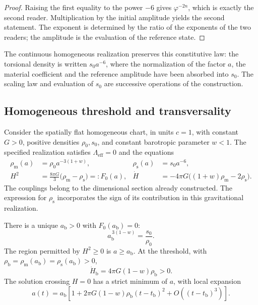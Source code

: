 \begin{proof}
Raising the first equality to the power \(-6\) gives
\(\varphi^{-2n}\), which is exactly the second reader. Multiplication
by the initial amplitude yields the second statement. The exponent
is determined by the ratio of the exponents of the two readers;
the amplitude is the evaluation of the reference state.
\end{proof}

The continuous homogeneous realization preserves this constitutive law:
the torsional density is written \(s_0a^{-6}\), where the normalization
of the factor \(a\), the material coefficient and the reference amplitude
have been absorbed into \(s_0\). The scaling law and evaluation of
\(s_0\) are successive operations of the construction.

\subsection{Homogeneous threshold and transversality}
\label{vii:sec:umbral-rebote}

Consider the spatially flat homogeneous chart, in units \(c=1\),
with constant \(G>0\), positive densities \(\rho_0,s_0\), and constant
barotropic parameter \(w<1\). The specified realization satisfies
\(\Lambda_{\mathrm{eff}}=0\) and the equations
\begin{align}
 \rho_{\mathrm m}(a)&=\rho_0a^{-3(1+w)},&
 \rho_{\mathrm s}(a)&=s_0a^{-6},\\
 H^2&=\frac{8\pi G}{3}
        \bigl(\rho_{\mathrm m}-\rho_{\mathrm s}\bigr)
        =:F_0(a),&
 \dot H&=-4\pi G
        \bigl((1+w)\rho_{\mathrm m}-2\rho_{\mathrm s}\bigr).
 \label{vii:eq:dinamica-homogenea}
\end{align}
The couplings belong to the dimensional section already constructed.
The expression for \(\rho_{\mathrm s}\) incorporates the sign of its
contribution in this gravitational realization.

\begin{theorem}
\label{vii:thm:rebote}
There is a unique \(a_{\mathrm b}>0\) with \(F_0(a_{\mathrm b})=0\):
\[
 a_{\mathrm b}^{\,3(1-w)}=\frac{s_0}{\rho_0}.
\]
The region permitted by \(H^2\geq0\) is \(a\geq a_{\mathrm b}\).
At the threshold, with
\(\rho_{\mathrm b}=\rho_{\mathrm m}(a_{\mathrm b})
                  =\rho_{\mathrm s}(a_{\mathrm b})>0\),
\[
 \dot H_{\mathrm b}=4\pi G(1-w)\rho_{\mathrm b}>0.
\]
The solution crossing \(H=0\) has a strict minimum of \(a\),
with local expansion
\[
 a(t)=a_{\mathrm b}\left[
 1+2\pi G(1-w)\rho_{\mathrm b}(t-t_{\mathrm b})^2
 +O((t-t_{\mathrm b})^3)\right].
\]
\end{theorem}

